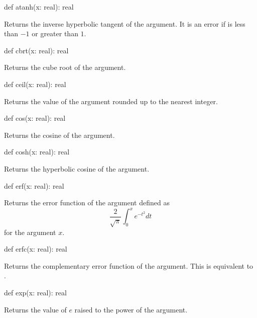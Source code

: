 \begin{protohead}
def atanh(x: real): real
\end{protohead}
\begin{protobody}
Returns the inverse hyperbolic tangent of the argument.  It is an error
if  is less than $-1$ or greater than $1$.
\end{protobody}

\begin{protohead}
def cbrt(x: real): real
\end{protohead}
\begin{protobody}
Returns the cube root of the argument.
\end{protobody}

\begin{protohead}
def ceil(x: real): real
\end{protohead}
\begin{protobody}
Returns the value of the argument rounded up to the nearest integer.
\end{protobody}

\begin{protohead}
def cos(x: real): real
\end{protohead}
\begin{protobody}
Returns the cosine of the argument.
\end{protobody}

\begin{protohead}
def cosh(x: real): real
\end{protohead}
\begin{protobody}
Returns the hyperbolic cosine of the argument.
\end{protobody}

\begin{protohead}
def erf(x: real): real
\end{protohead}
\begin{protobody}
Returns the error function of the argument defined as
$$\frac{2}{\sqrt{\pi}}\int^x_0e^{-t^2}dt$$
for the argument $x$.
\end{protobody}

\begin{protohead}
def erfc(x: real): real
\end{protohead}
\begin{protobody}
Returns the complementary error function of the argument.  This is
equivalent to .
\end{protobody}

\begin{protohead}
def exp(x: real): real
\end{protohead}
\begin{protobody}
Returns the value of $e$ raised to the power of the argument.
\end{protobody}


